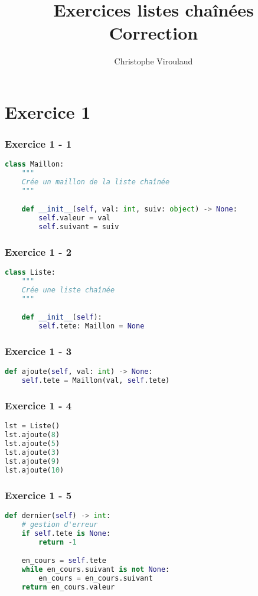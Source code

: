 \documentclass[svgnames,11pt]{beamer}
\author[]{Christophe Viroulaud}
\title{Exercices listes chaînées\\Correction}
\date{\framebox{\textbf{Archi 04}}}
\institute{Terminale - NSI}
\begin{document}
\begin{frame}
\titlepage
\end{frame}
\section{Exercice 1}
\begin{frame}[fragile]
    \frametitle{Exercice 1 - 1}

\begin{lstlisting}[language=Python , basicstyle=\ttfamily\small, xleftmargin=0em, xrightmargin=0em]
class Maillon:
    """
    Crée un maillon de la liste chaînée
    """

    def __init__(self, val: int, suiv: object) -> None:
        self.valeur = val
        self.suivant = suiv
\end{lstlisting}

\end{frame}
\begin{frame}[fragile]
    \frametitle{Exercice 1 - 2}

\begin{lstlisting}[language=Python , basicstyle=\ttfamily\small, xleftmargin=2em, xrightmargin=2em]
class Liste:
    """
    Crée une liste chaînée
    """

    def __init__(self):
        self.tete: Maillon = None
\end{lstlisting}

\end{frame}
\begin{frame}[fragile]
    \frametitle{Exercice 1 - 3}

\begin{lstlisting}[language=Python , basicstyle=\ttfamily\small, xleftmargin=2em, xrightmargin=2em]
def ajoute(self, val: int) -> None:
    self.tete = Maillon(val, self.tete)
\end{lstlisting}

\end{frame}
\begin{frame}[fragile]
    \frametitle{Exercice 1 - 4}

\begin{lstlisting}[language=Python , basicstyle=\ttfamily\small, xleftmargin=2em, xrightmargin=2em]
lst = Liste()
lst.ajoute(8)
lst.ajoute(5)
lst.ajoute(3)
lst.ajoute(9)
lst.ajoute(10)
\end{lstlisting}

\end{frame}
\begin{frame}[fragile]
    \frametitle{Exercice 1 - 5}

\begin{lstlisting}[language=Python , basicstyle=\ttfamily\small, xleftmargin=2em, xrightmargin=2em]
def dernier(self) -> int:
    # gestion d'erreur
    if self.tete is None:
        return -1

    en_cours = self.tete
    while en_cours.suivant is not None:
        en_cours = en_cours.suivant
    return en_cours.valeur
\end{lstlisting}

\end{frame}
\end{document}
